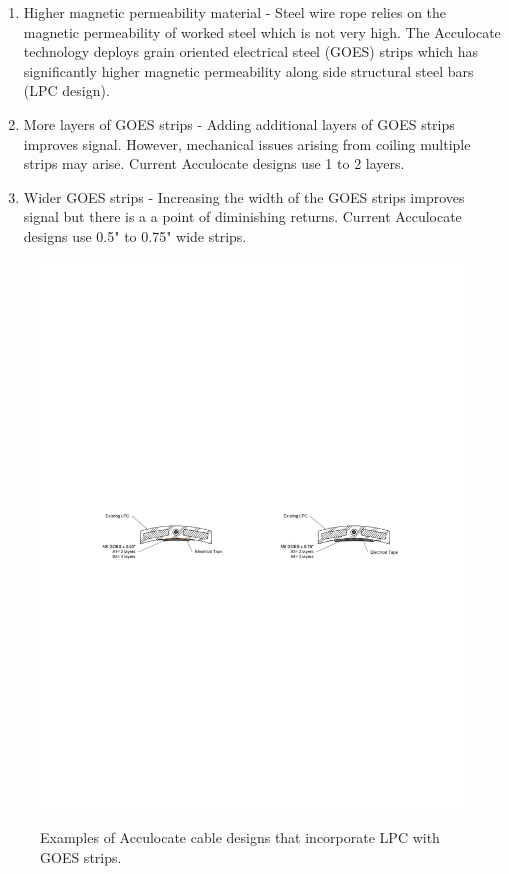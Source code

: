 \documentclass[paper=a4, fontsize=11pt]{scrartcl}
\numberwithin{equation}{section}		%
\numberwithin{figure}{section}			%
\numberwithin{table}{section}				%
\begin{document}
\begin{enumerate}
    \item Higher magnetic permeability material - Steel wire rope relies on the magnetic permeability of worked steel which is not very high.  The Acculocate technology deploys grain oriented electrical steel (GOES) strips which has significantly higher magnetic permeability along side structural steel bars (LPC design).  
    \item More layers of GOES strips - Adding additional layers of GOES strips improves signal.  However, mechanical issues arising from coiling multiple strips may arise.  Current Acculocate designs use 1 to 2 layers.
    \item Wider GOES strips - Increasing the width of the GOES strips improves signal but there is a a point of diminishing returns.  Current Acculocate designs use 0.5" to 0.75" wide strips.
\end{enumerate}

\begin{figure}[h!]
    \centering
    \caption{Examples of Acculocate cable designs that incorporate LPC with GOES strips.}
    \includegraphics[width=1.0\textwidth]{figures/acculocate_cables.pdf}
    \label{fig:cables}
\end{figure}
\end{document}
